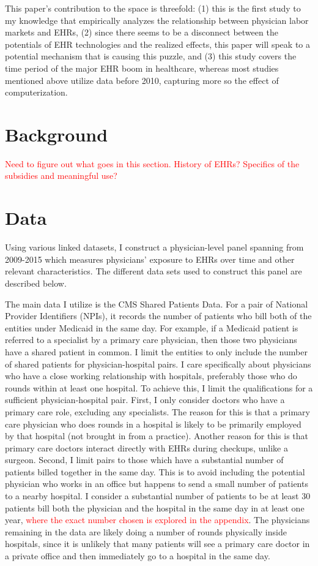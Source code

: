\documentclass[11pt]{article}
\begin{document}
This paper's contribution to the space is threefold: (1) this is the first study to my knowledge that empirically analyzes the relationship between physician labor markets and EHRs, (2) since there seems to be a disconnect between the potentials of EHR technologies and the realized effects, this paper will speak to a potential mechanism that is causing this puzzle, and (3) this study covers the time period of the major EHR boom in healthcare, whereas most studies mentioned above utilize data before 2010, capturing more so the effect of computerization.


\section{Background}

\textcolor{red}{Need to figure out what goes in this section. History of EHRs? Specifics of the subsidies and meaningful use?}

\section{Data}

Using various linked datasets, I construct a physician-level panel spanning from 2009-2015 which measures physicians' exposure to EHRs over time and other relevant characteristics. The different data sets used to construct this panel are described below.

The main data I utilize is the CMS Shared Patients Data. For a pair of National Provider Identifiers (NPIs), it records the number of patients who bill both of the entities under Medicaid in the same day. For example, if a Medicaid patient is referred to a specialist by a primary care physician, then those two physicians have a shared patient in common. I limit the entities to only include the number of shared patients for physician-hospital pairs. I care specifically about physicians who have a close working relationship with hospitals, preferably those who do rounds within at least one hospital. To achieve this, I limit the qualifications for a sufficient physician-hospital pair. First, I only consider doctors who have a primary care role, excluding any specialists. The reason for this is that a primary care physician who does rounds in a hospital is likely to be primarily employed by that hospital (not brought in from a practice). Another reason for this is that primary care doctors interact directly with EHRs during checkups, unlike a surgeon. Second, I limit pairs to those which have a substantial number of patients billed together in the same day. This is to avoid including the potential physician who works in an office but happens to send a small number of patients to a nearby hospital. I consider a substantial number of patients to be at least 30 patients bill both the physician and the hospital in the same day in at least one year, \textcolor{red}{where the exact number chosen is explored in the appendix}. The physicians remaining in the data are likely doing a number of rounds physically inside hospitals, since it is unlikely that many patients will see a primary care doctor in a private office and then immediately go to a hospital in the same day. 
\end{document}
